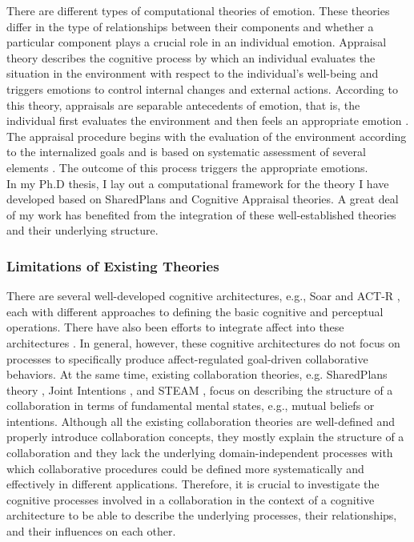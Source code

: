 \documentclass[a4paper, 11pt]{article}
\begin{document}
\begin{small}
There are different types of computational theories of emotion. These theories
differ in the type of relationships between their components and whether a
particular component plays a crucial role in an individual emotion. Appraisal
theory describes the cognitive process by which an individual evaluates the
situation in the environment with respect to the individual's well-being and
triggers emotions to control internal changes and external actions. According to
this theory, appraisals are separable antecedents of emotion, that is, the
individual first evaluates the environment and then feels an appropriate emotion
\cite{scherer:appraisal-processes}. The appraisal procedure begins with the
evaluation of the environment according to the internalized goals and is based
on systematic assessment of several elements
\cite{scherer:sequential-appraisal-process}. The outcome of this process
triggers the appropriate emotions.\\

In my Ph.D thesis, I lay out a computational framework for the theory I have
developed based on SharedPlans and Cognitive Appraisal theories. A great deal of
my work has benefited from the integration of these well-established theories
and their underlying structure.

\subsubsection*{Limitations of Existing Theories}

There are several well-developed
cognitive architectures, e.g., Soar \cite{laird:soar} and ACT-R
\cite{anderson:act-r}, each with different approaches to defining the basic
cognitive and perceptual operations. There have also been efforts to integrate
affect into these architectures \cite{marinier:behavior-emotion}. In general,
however, these cognitive architectures do not focus on processes to specifically
produce affect-regulated goal-driven collaborative behaviors. At the same time,
existing collaboration theories, e.g. SharedPlans theory
\cite{grosz:plans-discourse}, Joint Intentions \cite{cohen:teamwork}, and STEAM
\cite{tambe:flexible-teamwork}, focus on describing the structure of a
collaboration in terms of fundamental mental states, e.g., mutual beliefs or
intentions. Although all the existing collaboration theories are well-defined
and properly introduce collaboration concepts, they mostly explain the structure
of a collaboration and they lack the underlying domain-independent processes
with which collaborative procedures could be defined more systematically and
effectively in different applications. Therefore, it is crucial to investigate
the cognitive processes involved in a collaboration in the context of a
cognitive architecture to be able to describe the underlying processes, their
relationships, and their influences on each other.\\


\end{small}
\end{document}
